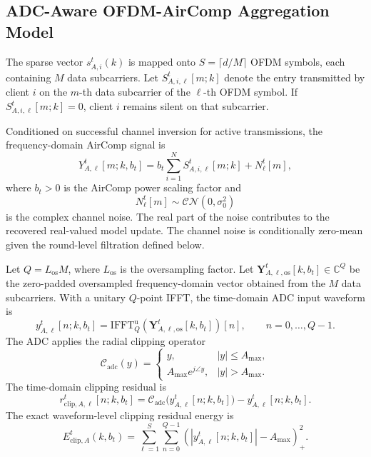 \documentclass[conference]{IEEEtran}
\begin{document}
\subsection{ADC-Aware OFDM-AirComp Aggregation Model}

The sparse vector $s_{A,i}^t(k)$ is mapped onto $S=\lceil d/M\rceil$ OFDM symbols, each containing $M$ data subcarriers. Let $S_{A,i,\ell}^t[m;k]$ denote the entry transmitted by client $i$ on the $m$-th data subcarrier of the $\ell$-th OFDM symbol. If $S_{A,i,\ell}^t[m;k]=0$, client $i$ remains silent on that subcarrier.

Conditioned on successful channel inversion for active transmissions, the frequency-domain AirComp signal is
\begin{equation}
    Y_{A,\ell}^t[m;k,b_t]
    =b_t\sum_{i=1}^{N}S_{A,i,\ell}^t[m;k]+N_\ell^t[m],
\end{equation}
where $b_t>0$ is the AirComp power scaling factor and
\begin{equation}
    N_\ell^t[m]\sim\mathcal{CN}(0,\sigma_0^2)
\end{equation}
is the complex channel noise. The real part of the noise contributes to the recovered real-valued model update. The channel noise is conditionally zero-mean given the round-level filtration defined below.

Let $Q=L_{\mathrm{os}}M$, where $L_{\mathrm{os}}$ is the oversampling factor. Let $\mathbf{Y}_{A,\ell,\mathrm{os}}^t[k,b_t]\in\mathbb{C}^{Q}$ be the zero-padded oversampled frequency-domain vector obtained from the $M$ data subcarriers. With a unitary $Q$-point IFFT, the time-domain ADC input waveform is
\begin{equation}
    y_{A,\ell}^t[n;k,b_t]
    =\mathrm{IFFT}_{Q}^{\mathrm u}\!\left(\mathbf{Y}_{A,\ell,\mathrm{os}}^t[k,b_t]\right)[n],
    \qquad n=0,\ldots,Q-1.
\end{equation}
The ADC applies the radial clipping operator
\begin{equation}
    \mathcal{C}_{\mathrm{adc}}(y)=
    \begin{cases}
        y, & |y|\le A_{\max},\\
        A_{\max}e^{j\angle y}, & |y|>A_{\max}.
    \end{cases}
\end{equation}
The time-domain clipping residual is
\begin{equation}
    r_{\mathrm{clip},A,\ell}^t[n;k,b_t]
    =\mathcal{C}_{\mathrm{adc}}\big(y_{A,\ell}^t[n;k,b_t]\big)-y_{A,\ell}^t[n;k,b_t].
\end{equation}
The exact waveform-level clipping residual energy is
\begin{equation}
    \label{eqn:eclip_def}
    E_{\mathrm{clip},A}^t(k,b_t)
    =\sum_{\ell=1}^{S}\sum_{n=0}^{Q-1}
    \left(|y_{A,\ell}^t[n;k,b_t]|-A_{\max}\right)_+^2.
\end{equation}
\end{document}
